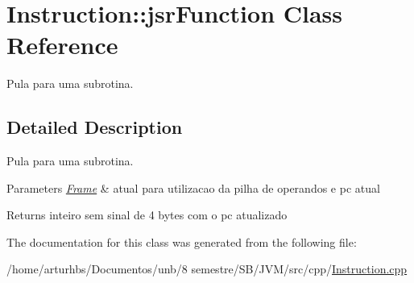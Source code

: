 \hypertarget{classInstruction_1_1jsrFunction}{}\section{Instruction\+:\+:jsr\+Function Class Reference}
\label{classInstruction_1_1jsrFunction}


Pula para uma subrotina.  




\subsection{Detailed Description}
Pula para uma subrotina. 


\begin{DoxyParams}{Parameters}
{\em \hyperlink{classFrame}{Frame}} & atual para utilizacao da pilha de operandos e pc atual \\
\hline
\end{DoxyParams}
\begin{DoxyReturn}{Returns}
inteiro sem sinal de 4 bytes com o pc atualizado 
\end{DoxyReturn}


The documentation for this class was generated from the following file\+:\begin{DoxyCompactItemize}
\item 
/home/arturhbs/\+Documentos/unb/8 semestre/\+S\+B/\+J\+V\+M/src/cpp/\hyperlink{Instruction_8cpp}{Instruction.\+cpp}\end{DoxyCompactItemize}
